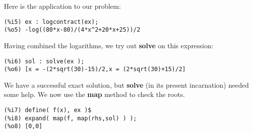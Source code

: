 \documentclass[12pt]{article}
\begin{document}
\normalsize
Here is the application to our problem:
\small
\begin{verbatim}
(%i5) ex : logcontract(ex);
(%o5) -log((80*x-80)/(4*x^2+20*x+25))/2
\end{verbatim}
\normalsize
Having combined the logarithms, we try out \textbf{solve} on this expression:
\small
\begin{verbatim}
(%i6) sol : solve(ex );
(%o6) [x = -(2*sqrt(30)-15)/2,x = (2*sqrt(30)+15)/2]
\end{verbatim}
\normalsize
We have a successful exact solution, but \textbf{solve} (in its present incarnation) needed
  some help.
We now use the \textbf{map} method to check the roots.
\small
\begin{verbatim}
(%i7) define( f(x), ex )$ 
(%i8) expand( map(f, map(rhs,sol) ) );
(%o8) [0,0]
\end{verbatim}
\normalsize
\end{document}
